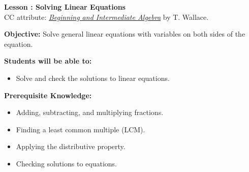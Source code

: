 \documentclass[12pt]{article}
\theoremstyle{definition}
\begin{document}
{\bf \large Lesson : Solving Linear Equations}\\
CC attribute: \href{http://www.wallace.ccfaculty.org/book/book.html}{\it{Beginning and Intermediate Algebra}} by T. Wallace. \hfill \doclicenseImage[imagewidth=5em]\\
\par
{\bf Objective:} Solve general linear equations with variables on both sides of the equation. \\
\par
{\bf Students will be able to:}
\begin{itemize}
	\item Solve and check the solutions to linear equations.
\end{itemize}
{\bf Prerequisite Knowledge:}
\begin{itemize}
	\item Adding, subtracting, and multiplying fractions.
	\item Finding a least common multiple (LCM).
	\item Applying the distributive property.
	\item Checking solutions to equations.
\end{itemize}
\hrulefill
\end{document}
